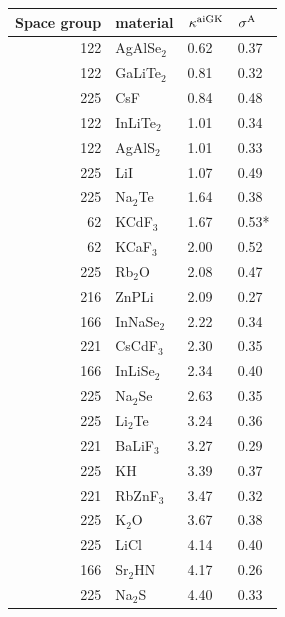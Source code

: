 \begin{table}[ht]
  \centering
  \selectfont
\begin{tabularx}{\linewidth}{rXXX}
\toprule
Space group  &    material & $\kappa^{\rm aiGK}$ & $\sigma^\mathrm{A}$  \\
\midrule
         122 & AgAlSe$_2$ &             0.62 &       0.37 \\
         122 & GaLiTe$_2$ &             0.81 &       0.32 \\
         225 &        CsF &             0.84 &       0.48 \\
         122 & InLiTe$_2$ &             1.01 &       0.34 \\
         122 &  AgAlS$_2$ &             1.01 &       0.33 \\
         225 &        LiI &             1.07 &       0.49 \\
         225 &   Na$_2$Te &             1.64 &       0.38 \\
          62 &   KCdF$_3$ &             1.67 &       0.53* \\
          62 &   KCaF$_3$ &             2.00 &       0.52 \\
         225 &    Rb$_2$O &             2.08 &       0.47 \\
         216 &      ZnPLi &             2.09 &       0.27 \\
         166 & InNaSe$_2$ &             2.22 &       0.34 \\
         221 &  CsCdF$_3$ &             2.30 &       0.35 \\
         166 & InLiSe$_2$ &             2.34 &       0.40 \\
         225 &   Na$_2$Se &             2.63 &       0.35 \\
         225 &   Li$_2$Te &             3.24 &       0.36 \\
         221 &  BaLiF$_3$ &             3.27 &       0.29 \\
         225 &         KH &             3.39 &       0.37 \\
         221 &  RbZnF$_3$ &             3.47 &       0.32 \\
         225 &     K$_2$O &             3.67 &       0.38 \\
         225 &       LiCl &             4.14 &       0.40 \\
         166 &   Sr$_2$HN &             4.17 &       0.26 \\
         225 &    Na$_2$S &             4.40 &       0.33 \\

\end{tabularx}
\end{table}
